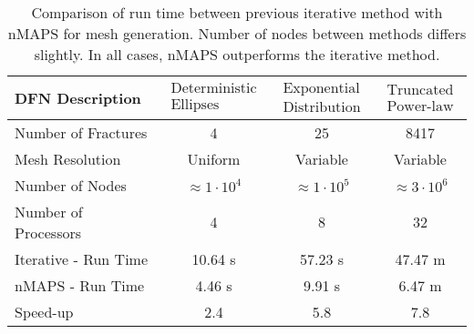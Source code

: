 \documentclass[preprint, 10pt]{elsarticle}
\theoremstyle{definition}
\theoremstyle{remark}
\begin{document}
\begin{table}
    \begin{tabular}{|l|c|c|c|}
        \hline
        DFN Description & $\begin{matrix}
        	\text{Deterministic} \\ \text{Ellipses}
        \end{matrix}$ & $\begin{matrix}
        \text{Exponential} \\ \text{Distribution}
    \end{matrix}$ & $\begin{matrix}
    \text{Truncated} \\ \text{Power-law}
\end{matrix}$ \\ \hline
         Number of Fractures & 4 & 25 & 8417 \\
          Mesh Resolution & Uniform & Variable & Variable\\ 
          Number of Nodes & $\approx 1 \cdot 10^4$ & $\approx 1 \cdot 10^5$ & $\approx 3 \cdot 10^6$ \\ 
          Number of Processors & 4 & 8 & 32 \\
          Iterative - Run Time & 10.64 s  & 57.23 s & 47.47 m  \\
          nMAPS - Run Time &  4.46 s & 9.91 s &  6.47 m  \\
          Speed-up & 2.4 & 5.8 & 7.8 \\
    \hline
    \end{tabular}
\caption{Comparison of run time between previous iterative method with nMAPS for mesh generation. Number of nodes between methods differs slightly. In all cases, nMAPS outperforms the iterative method. \label{tbl:runtime}}
\end{table}


\end{document}
